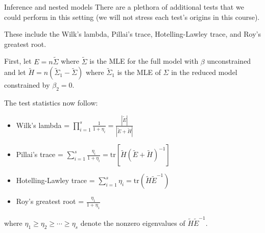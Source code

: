 \documentclass[
  ignorenonframetext,
]{beamer}
\begin{document}
\begin{frame}{Inference and nested models}
\protect\hypertarget{inference-and-nested-models}{}
There are a plethora of additional tests that we could perform in this
setting (we will not stress each test's origins in this course).

These include the Wilk's lambda, Pillai's trace, Hotelling-Lawley trace,
and Roy's greatest root.

First, let \(E = n\tilde{\Sigma}\) where \(\tilde{\Sigma}\) is the MLE
for the full model with \(\beta\) unconstrained and let
\(\tilde{H} = n(\tilde{\Sigma}_1 - \tilde{\Sigma})\) where
\(\tilde{\Sigma}_1\) is the MLE of \(\Sigma\) in the reduced model
constrained by \(\beta_2 = 0\).

The test statistics now follow:

\begin{itemize}
\item Wilk's lambda = $\prod_{i=1}^s \frac{1}{1+\eta_i} = \frac{|\tilde{E}|}{|\tilde{E} + \tilde{H}|}$
\item Pillai's trace = $\sum_{i=1}^s \frac{\eta_i}{1 + \eta_i} = \text{tr}[\tilde{H}(\tilde{E} + \tilde{H})^{-1}]$
\item Hotelling-Lawley trace = $\sum_{i=1}^s\eta_i = \text{tr}(\tilde{H}\tilde{E}^{-1})$
\item Roy's greatest root = $\frac{\eta_1}{1 + \eta_1}$
\end{itemize}

where \(\eta_1 \geq \eta_2 \geq \cdots \geq \eta_s\) denote the nonzero
eigenvalues of \(\tilde{H}\tilde{E}^{-1}\).
\end{frame}
\end{document}
